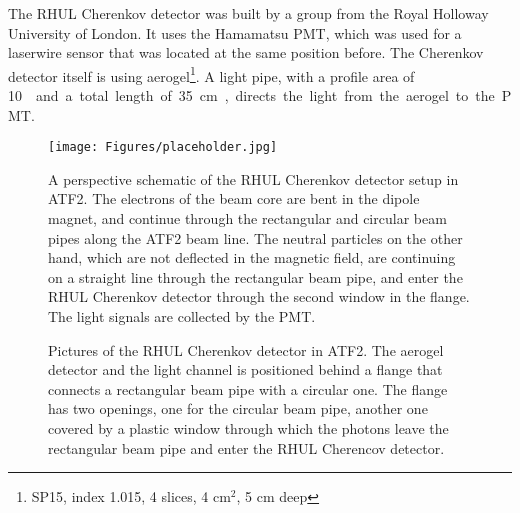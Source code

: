 The RHUL Cherenkov detector was built by a group from the Royal Holloway University of London. It uses the Hamamatsu PMT, which was used for a laserwire sensor that was located at the same position before. The Cherenkov detector itself is using aerogel\footnote{SP15, index 1.015, 4 slices, 4 cm$^2$, 5 cm deep}. A light pipe, with a profile area of \SI{10}{\centi\metre\square} and a total length of \SI{35}{\centi\metre}, directs the light from the aerogel to the PMT.

\begin{figure}
\centering
\texttt{[image: Figures/placeholder.jpg]}%
\caption[Schematic drawing of the RHUL Cherenkov detector setup]{A perspective schematic of the RHUL Cherenkov detector setup in ATF2. The electrons of the beam core are bent in the dipole magnet, and continue through the rectangular and circular beam pipes along the ATF2 beam line. The neutral particles on the other hand, which are not deflected in the magnetic field, are continuing on a straight line through the rectangular beam pipe, and enter the RHUL Cherenkov detector through the second window in the flange. The light signals are collected by the PMT.}
\label{fig:RHUL_Cherenkov_Drawing}
\end{figure}

\begin{figure}
\begin{center}
\caption[Pictures of the RHUL Cherenkov detector]{Pictures of the RHUL Cherenkov detector in ATF2. The aerogel detector and the light channel is positioned behind a flange that connects a rectangular beam pipe with a circular one. The flange has two openings, one for the circular beam pipe, another one covered by a plastic window through which the photons leave the rectangular beam pipe and enter the RHUL Cherencov detector.}
\label{fig:RHUL_Cherenkov}
\end{center}
\end{figure}

